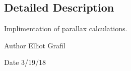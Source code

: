 \subsection{Detailed Description}
Implimentation of parallax calculations. 

\begin{DoxyAuthor}{Author}
Elliot Grafil 
\end{DoxyAuthor}
\begin{DoxyDate}{Date}
3/19/18 
\end{DoxyDate}
